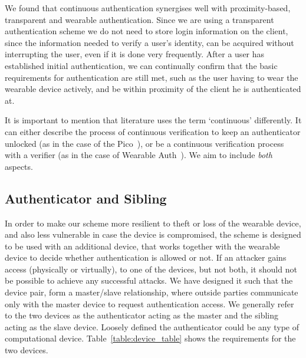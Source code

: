We found that continuous authentication synergises well with prox\-imity-based, transparent and wearable authentication. 
Since we are using a transparent authentication scheme we do not need to store login information on the client, since the information needed to verify a user's identity, can be acquired without interrupting the user, even if it is done very frequently. After a user has established initial authentication, we can continually confirm that the basic requirements for authentication are still met, such as the user having to wear the wearable device actively, and be within proximity of the client he is authenticated at.

It is important to mention that literature uses the term `continuous' differently. It can either describe the process of continuous verification to keep an authenticator unlocked (as in the case of the Pico~\cite{stajano2011pico}), or be a continuous verification process with a verifier (as in the case of Wearable Auth~\cite{ojala2008wearable}). We aim to include \textit{both} aspects.

\subsection{Authenticator and Sibling}
In order to make our scheme more resilient to theft or loss of the wearable device, and also less vulnerable in case the device is compromised, the scheme is designed to be used with an additional device, that works together with the wearable device to decide whether authentication is allowed or not. If an attacker gains access (physically or virtually), to one of the devices, but not both, it should not be possible to achieve any successful attacks. We have designed it such that the device pair, form a master/slave relationship, where outside parties communicate only with the master device to request authentication access. We generally refer to the two devices as the \gls{authenticator} acting as the master and the \gls{sibling} acting as the slave device. Loosely defined the \gls{authenticator} could be any type of computational device. Table~\ref{table:device_table} shows the requirements for the two devices. 

